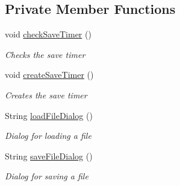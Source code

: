 \subsection*{Private Member Functions}
\begin{DoxyCompactItemize}
\item 
void \hyperlink{class_web_analyzer_1_1_u_i_1_1_interaction_objects_1_1_experiment_object_a0ccb4957ecd33c93abb3de68ea372b56}{check\+Save\+Timer} ()
\begin{DoxyCompactList}\small\item\em Checks the save timer \end{DoxyCompactList}\item 
void \hyperlink{class_web_analyzer_1_1_u_i_1_1_interaction_objects_1_1_experiment_object_a43412850f157306eed89cb600c7e8cec}{create\+Save\+Timer} ()
\begin{DoxyCompactList}\small\item\em Creates the save timer \end{DoxyCompactList}\item 
String \hyperlink{class_web_analyzer_1_1_u_i_1_1_interaction_objects_1_1_experiment_object_a496179a7d5d2ebc88beb1790e2258c8f}{load\+File\+Dialog} ()
\begin{DoxyCompactList}\small\item\em Dialog for loading a file \end{DoxyCompactList}\item 
String \hyperlink{class_web_analyzer_1_1_u_i_1_1_interaction_objects_1_1_experiment_object_a80ffb6140ccb91ccee84ccf9d67967cf}{save\+File\+Dialog} ()
\begin{DoxyCompactList}\small\item\em Dialog for saving a file \end{DoxyCompactList}\end{DoxyCompactItemize}
